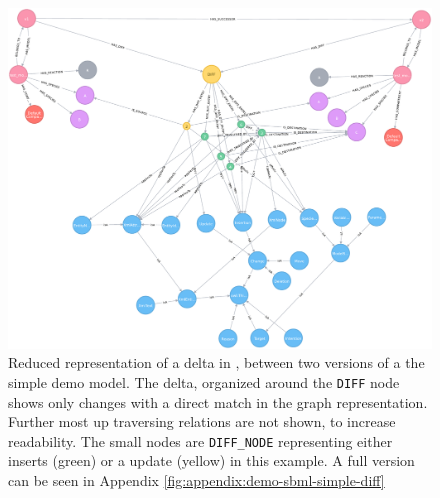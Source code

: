 \begin{figure}
	\centering
	\includegraphics[width=\textwidth]{resources/neo4j-renders/demo-sbml-simple-diff.pdf}
	\caption[Reduced representation of a delta in \masymos, between two versions of a the simple \sbml demo model]{Reduced representation of a delta in \masymos, between two versions of a the simple \sbml demo model. The delta, organized around the \texttt{DIFF} node shows only changes with a direct match in the graph representation. Further most up traversing relations are not shown, to increase readability.
	The small nodes are \texttt{DIFF\_NODE} representing either inserts (green) or a update (yellow) in this example. A full version can be seen in Appendix \ref{fig:appendix:demo-sbml-simple-diff}}
	\label{fig:results:simple-diff}
\end{figure}